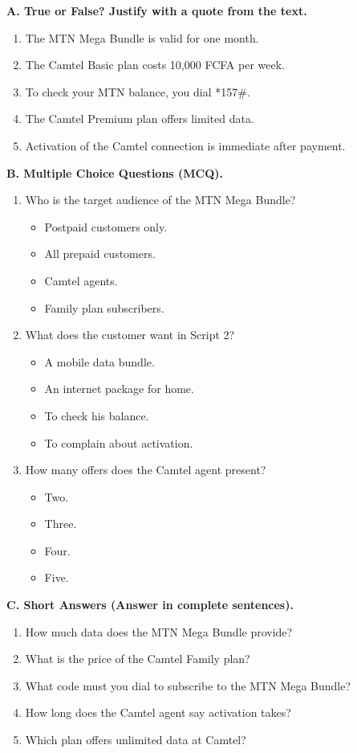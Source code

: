 \documentclass[11pt]{article}
\begin{document}
\begin{exercice}
\textbf{A. True or False? Justify with a quote from the text.}
\begin{enumerate}
\item The MTN Mega Bundle is valid for one month.
\item The Camtel Basic plan costs 10,000 FCFA per week.
\item To check your MTN balance, you dial *157\#.
\item The Camtel Premium plan offers limited data.
\item Activation of the Camtel connection is immediate after payment.
\end{enumerate}

\textbf{B. Multiple Choice Questions (MCQ).}
\begin{enumerate}
\item Who is the target audience of the MTN Mega Bundle?
      \begin{itemize}
      \item[a)] Postpaid customers only.
      \item[b)] All prepaid customers.
      \item[c)] Camtel agents.
      \item[d)] Family plan subscribers.
      \end{itemize}
\item What does the customer want in Script 2?
      \begin{itemize}
      \item[a)] A mobile data bundle.
      \item[b)] An internet package for home.
      \item[c)] To check his balance.
      \item[d)] To complain about activation.
      \end{itemize}
\item How many offers does the Camtel agent present?
      \begin{itemize}
      \item[a)] Two.
      \item[b)] Three.
      \item[c)] Four.
      \item[d)] Five.
      \end{itemize}
\end{enumerate}

\textbf{C. Short Answers (Answer in complete sentences).}
\begin{enumerate}
\item How much data does the MTN Mega Bundle provide?
\item What is the price of the Camtel Family plan?
\item What code must you dial to subscribe to the MTN Mega Bundle?
\item How long does the Camtel agent say activation takes?
\item Which plan offers unlimited data at Camtel?
\end{enumerate}


\end{exercice}
\end{document}
